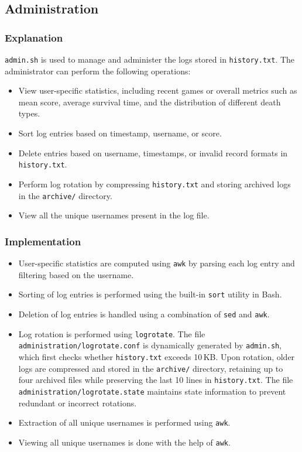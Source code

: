 \documentclass{article}
\begin{document}
    \subsection{Administration}
    \label{sec:Administration}
    \subsubsection{Explanation}
    \texttt{admin.sh} is used to manage and administer the logs stored in \texttt{history.txt}. The administrator can perform the following operations:
    \begin{itemize}
        \item View user-specific statistics, including recent games or overall metrics such as mean score, average survival time, and the distribution of different death types.
        \item Sort log entries based on timestamp, username, or score.
        \item Delete entries based on username, timestamps, or invalid record formats in \texttt{history.txt}.
        \item Perform log rotation by compressing \texttt{history.txt} and storing archived logs in the \texttt{archive/} directory.
        \item View all the unique usernames present in the log file.
    \end{itemize}
    \subsubsection{Implementation}
    \begin{itemize}
        \item User-specific statistics are computed using \texttt{awk} by parsing each log entry and filtering based on the username.
        \item Sorting of log entries is performed using the built-in \texttt{sort} utility in Bash.
        \item Deletion of log entries is handled using a combination of \texttt{sed} and \texttt{awk}.
        \item Log rotation is performed using \texttt{logrotate}. The file \texttt{administration/logrotate.conf} is dynamically generated by \texttt{admin.sh}, which first checks whether \texttt{history.txt} exceeds 10\,KB. Upon rotation, older logs are compressed and stored in the \texttt{archive/} directory, retaining up to four archived files while preserving the last 10 lines in \texttt{history.txt}. The file \texttt{administration/logrotate.state} maintains state information to prevent redundant or incorrect rotations.
        \item Extraction of all unique usernames is performed using \texttt{awk}.
        \item Viewing all unique usernames is done with the help of \texttt{awk}.
    \end{itemize}
\end{document}
